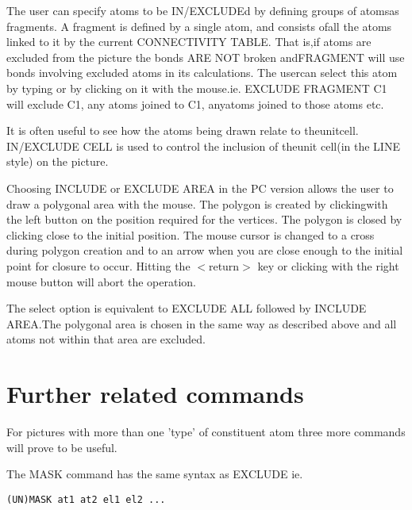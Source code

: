 \documentclass[10pt,a4paper]{report}
\begin{document}
\bigskip{}The user can specify atoms to be IN/EXCLUDEd by defining groups of atomsas fragments. A fragment is defined by a single atom, and consists ofall the atoms linked to it by the current CONNECTIVITY TABLE. That is,if atoms are excluded from the picture the bonds ARE NOT broken andFRAGMENT will use bonds involving excluded atoms in its calculations. The usercan select this atom by typing or by clicking on it with the mouse.ie. EXCLUDE FRAGMENT C1 will exclude C1, any atoms joined to C1, anyatoms joined to those atoms etc.

\bigskip{}It is often useful to see how the atoms being drawn relate to theunitcell. IN/EXCLUDE CELL is used to control the inclusion of theunit cell(in the LINE style) on the picture.

\bigskip{}Choosing INCLUDE or EXCLUDE AREA in the PC version allows the user to draw a polygonal area with the mouse. The polygon is created by clickingwith the left button on the position required for the vertices. The polygon is closed by clicking close to the initial position. The mouse cursor is changed to a cross during polygon creation and to an arrow when you are close enough to the initial point for closure to occur. Hitting the $<$return$>$ key or clicking with the right mouse button will abort the operation.

\bigskip{}The select option is equivalent to EXCLUDE ALL followed by INCLUDE AREA.The polygonal area is chosen in the same way as described above and all atoms not within that area are excluded.\section{Further related commands}


For pictures with more than one 'type' of constituent atom three more
commands will prove to be useful.


\bigskip{}




\bigskip{}




The MASK command has the same syntax as EXCLUDE ie.
\small\begin{verbatim}
(UN)MASK at1 at2 el1 el2 ...
\end{verbatim}\normalsize
\end{document}
